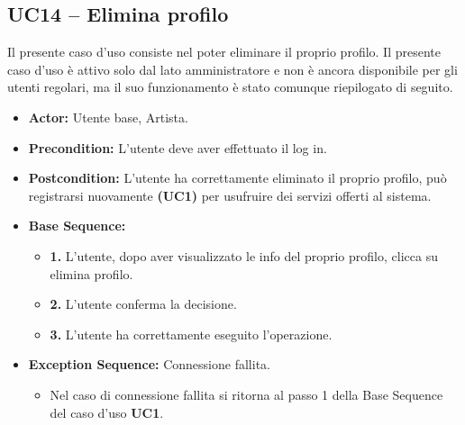 \subsection{UC14 -- Elimina profilo}
Il presente caso d'uso consiste nel poter eliminare il proprio profilo.
Il presente caso d'uso è attivo solo dal lato amministratore e non è
ancora disponibile per gli utenti regolari, ma il suo funzionamento
è stato comunque riepilogato di seguito.
\begin{itemize}
    \item \textbf{Actor:} Utente base, Artista.
    \item \textbf{Precondition:} L'utente deve aver effettuato il log in.
    \item \textbf{Postcondition:} L'utente ha correttamente eliminato il proprio profilo, può registrarsi nuovamente \textbf{(UC1)} per usufruire dei servizi offerti al sistema. 
    \item \textbf{Base Sequence:}
    \begin{itemize}
        \item \textbf{1.} L'utente, dopo aver visualizzato le info del proprio profilo, clicca su elimina profilo.
        \item \textbf{2.} L'utente conferma la decisione.
        \item \textbf{3.} L'utente ha correttamente eseguito l'operazione.
    \end{itemize}
    \item \textbf{Exception Sequence:} Connessione fallita.
    \begin{itemize}
        \item Nel caso di connessione fallita si ritorna al passo 1 della Base Sequence del caso d'uso \textbf{UC1}.
    \end{itemize}
\end{itemize}
\vspace{1cm}



\newpage
